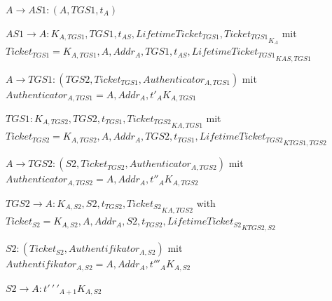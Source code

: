 \documentclass[a4paper]{article}
\begin{document}
\begin{multicols}{3}
\begin{itemize*}
\begin{enumerate*}
                  \item $A\rightarrow AS1:(A,TGS1, t_A)$
                  \item $AS1\rightarrow A:{K_{A,TGS1}, TGS1, t_{AS}, LifetimeTicket_{TGS1}, Ticket_{TGS1} }_{K_A}$ mit $Ticket_{TGS1}={K_{A,TGS1}, A, Addr_A, TGS1, t_{AS}, LifetimeTicket_{TGS1}}_{{K}{AS,TGS1}}$
                  \item $A\rightarrow TGS1:(TGS2,Ticket_{TGS1},Authenticator_{A,TGS1})$ mit $Authenticator_{A,TGS1}={A,Addr_A,t'_{A}}{K_{A,TGS1}}$
                  \item $TGS1:{K_{A,TGS2}, TGS2, t_{TGS1}, Ticket_{TGS2}}_{{K}{A,TGS1}}$ mit $Ticket_{TGS2}={K_{A,TGS2}, A, Addr_A, TGS2, t_{TGS1}, LifetimeTicket_{TGS2}}_{{K}{TGS1,TGS2}}$
                  \item $A\rightarrow TGS2:(S2,Ticket_{TGS2},Authenticator_{A,TGS2})$ mit $Authenticator_{A,TGS2}={A,Addr_A,t''_{A}}{K_{A,TGS2}}$
                  \item $TGS2\rightarrow A:{K_{A,S2},S2,t_{TGS2},Ticket_{S2}}_{{K}{A,TGS2}}$ with $Ticket_{S2}={K_{A,S2},A,Addr_A,S2,t_{TGS2}, LifetimeTicket_{S2}}_{{K}{TGS2,S2}}$
                  \item $S2:(Ticket_{S2}, Authentifikator_{A,S2})$ mit $Authentifikator_{A,S2}={A,Addr_A,t'''_{A}}{K_{A,S2}}$
                  \item $S2\rightarrow A:{t'\,'\,'_{A+1}}{K_{A,S2}}$
            \end{enumerate*}
      \end{itemize*}


\end{multicols}
\end{document}
